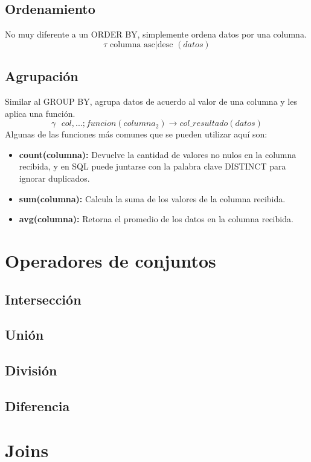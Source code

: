 \documentclass{article}
\begin{document}
\begin{multicols}{2}
		\subsection{Ordenamiento}
		
		No muy diferente a un ORDER BY, simplemente ordena datos por una columna.
		\[
		\tau \text{ columna asc|desc } (datos)
		\]
		
		\subsection{Agrupación}
		
		Similar al GROUP BY, agrupa datos de acuerdo al valor de una columna y les aplica una función.
		\[
		\gamma \text{ } col,...; funcion(columna_2) \rightarrow col\_resultado (datos)
		\]
		Algunas de las funciones más comunes que se pueden utilizar aquí son:
		
		\begin{itemize}
			\item \textbf{count(columna):} Devuelve la cantidad de valores no nulos en la columna recibida, y en SQL puede juntarse con la palabra clave DISTINCT para ignorar duplicados.
			\item \textbf{sum(columna):} Calcula la suma de los valores de la columna recibida.
			\item \textbf{avg(columna):} Retorna el promedio de los datos en la columna recibida.
		\end{itemize}
		
		\section{Operadores de conjuntos}
		
		\subsection{Intersección}
		\subsection{Unión}
		\subsection{División}
		\subsection{Diferencia}
		
		\section{Joins}
		

\end{multicols}
\end{document}
